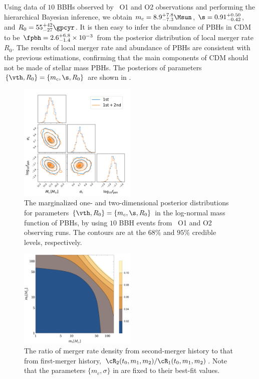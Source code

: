\documentclass[twocolumn]{aastex631}
\begin{document}
Using data of $10$ BBHs observed by \lvc\ O1 and O2 observations and performing
the hierarchical Bayesian inference, we obtain $m_c =8.9^{+7.8}_{-7.3} \Msun$,
$\s = 0.91^{+0.50}_{-0.42}$, and $R_0 = 55^{+42}_{-27} \gpcyr$.
It is then easy to infer the abundance of PBHs in CDM to be 
$\fpbh = 2.6^{+6.8}_{-1.4} \times 10^{-3}$ from the posterior distribution of 
local merger rate $R_0$.
The results of local merger rate and abundance of PBHs are consistent with
the previous estimations, confirming that the main components of CDM should
not be made of stellar mass PBHs.
The posteriors of parameters $\{\vth, R_0\} = \{m_c, \s, R_0\}$ are shown 
in .
\begin{figure}[htbp!]
	\centering
	\includegraphics[width=0.5\textwidth]{post-log.pdf}
	\caption{\label{posterior-log}
		The marginalized one- and two-dimensional posterior distributions for 
		parameters $\{\vth, R_0\} = \{m_c, \s, R_0\}$ in the log-normal mass function of PBHs, by using $10$ BBH events from \lvc\ O1 and O2 observing runs.
		The contours are at the $68\%$ and $95\%$ credible levels, respectively. 
	}
\end{figure}

\begin{figure}[htbp!]
	\centering
	\includegraphics[width=0.5\textwidth]{ratio-log.pdf}
	\caption{\label{ratio-log}
		The ratio of merger rate density from second-merger history
		to that from first-merger history,
		$\cR_2(t_0, m_1, m_2)/\cR_1(t_0, m_1, m_2)$. Note that the parameters $\{m_c, \sigma\}$ in  are fixed to their best-fit values.
	}
\end{figure}
\end{document}
